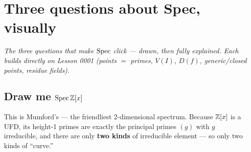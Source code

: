 \chapter{Three questions about Spec, visually}\label{ch:refC-spec-zx}

\noindent\textit{The three questions that make $\operatorname{Spec}$ click --- drawn, then fully
explained. Each builds directly on Lesson 0001 (points $=$ primes, $V(I)$, $D(f)$,
generic/closed points, residue fields).}

\section{Draw me $\operatorname{Spec}\mathbb{Z}[x]$}\label{sec:zx-draw}

This is Mumford's  --- the friendliest 2-dimensional
spectrum. Because $\mathbb{Z}[x]$ is a UFD, its height-1 primes are exactly the principal
primes $(g)$ with $g$ irreducible, and there are only \textbf{two kinds} of
irreducible element --- so only two kinds of ``curve.''

